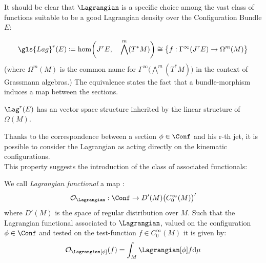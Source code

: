 \documentclass[Main]{subfiles}
\begin{document}
	It should be clear that $\Lagrangian$ is a specific choice among the vast class of functions suitable to be a good Lagrangian density over the  Configuration Bundle $E$:
	\begin{definition}\label{Def:LagrangianDensities}
		\begin{displaymath}
			\gls{Lag}^r (E) \coloneqq \hom\biggr(J^r E,\quad \bigwedge^m( T^*M)\biggr)  \cong \big\{f:\Gamma^\infty(J^r E) \rightarrow \Omega^m(M)  \big\}
		\end{displaymath}
	(where $\Omega^m(M)$ is the common name for $\Gamma^\infty \big( \bigwedge^m( T^*M) \big)$ in the context of Grassmann algebras.)
	The equivalence states the fact that a bundle-morphism induces a map between the sections.
	\end{definition}
	\begin{proposition}
		$\Lag^r(E)$ has an vector space structure inherited by the linear structure of $\Omega(M)$.
	\end{proposition}
	
	
	Thanks to the correspondence between a section $\phi \in \Conf$ and his r-th jet, it is possible to consider the Lagrangian as acting directly on the kinematic configurations.
	\\
	This property suggests the introduction of the class of associated functionals:
	\begin{definition}\label{Def:LagrangianFunctionals}
		We call \emph{Lagrangian functional} a map :
		\begin{displaymath}
			\mathcal{O}_\Lagrangian : \Conf \rightarrow D'(M) \big( C^\infty_0(M) \big)'
		\end{displaymath}			
		where  $D'(M)$ is the space of regular distribution over $M$.
			Such that the Lagrangian functional associated to $\Lagrangian$, valued on the configuration $\phi \in \Conf$ and tested on the test-function $f \in C^\infty_0(M)$ it is given by:
		\begin{displaymath}
			\mathcal{O}_\Lagrangian [\phi] (f) = \int_M \Lagrangian [\phi] f \textrm{d}\mu
		\end{displaymath}		
	\end{definition}	
	
\end{document}
